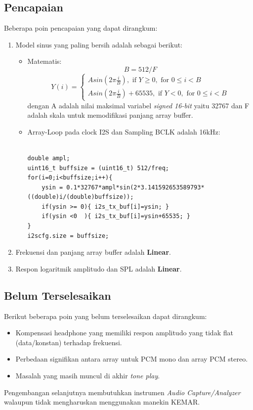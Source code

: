 \documentclass[12pt,]{article}
\begin{document}
	\subsection{Pencapaian}
	Beberapa poin pencapaian yang dapat dirangkum:
	\begin{enumerate}
		\item Model sinus yang paling bersih adalah sebagai berikut:
		\begin{itemize}
			\item Matematis:
			\[ B = 512/F \]
			\[
			Y(i) = 
			\begin{cases}
			A sin(2 \pi \frac{i}{B}), \text{ if } Y \geq 0, \text{ for } 0 \leq i < B\\ 
			A sin(2 \pi \frac{i}{B})+65535, \text{ if } Y < 0, \text{ for } 0 \leq i < B
			\end{cases}
			\]
			dengan A adalah nilai maksimal variabel \textit{signed 16-bit} yaitu 32767
			dan F adalah skala untuk memodifikasi panjang array buffer.
			
			\item Array-Loop pada clock I2S dan Sampling BCLK adalah 16kHz:
			\begin{verbatim}

double ampl;
uint16_t buffsize = (uint16_t) 512/freq;
for(i=0;i<buffsize;i++){
	ysin = 0.1*32767*ampl*sin(2*3.141592653589793*((double)i/(double)buffsize));
	if(ysin >= 0){ i2s_tx_buf[i]=ysin; }
	if(ysin <0  ){ i2s_tx_buf[i]=ysin+65535; }
}
i2scfg.size = buffsize;
			\end{verbatim}
		\end{itemize}
		
		\item Frekuensi dan panjang array buffer adalah \textbf{Linear}.
		
		\item Respon logaritmik amplitudo dan SPL adalah \textbf{Linear}. 
	\end{enumerate}

	\subsection{Belum Terselesaikan}
	Berikut beberapa poin yang belum terselesaikan dapat dirangkum:
	\begin{itemize}
		\item Kompensasi headphone yang memiliki respon amplitudo yang
		tidak flat (data/konstan) terhadap frekuensi.
		
		\item Perbedaan signifikan antara array untuk PCM mono dan array PCM stereo.
		
		\item Masalah  yang masih muncul di akhir \textit{tone play}. 
	\end{itemize}

	Pengembangan selanjutnya membutuhkan instrumen \textit{Audio Capture/Analyzer}
	walaupun tidak mengharuskan menggunakan manekin KEMAR.
	
\end{document}

